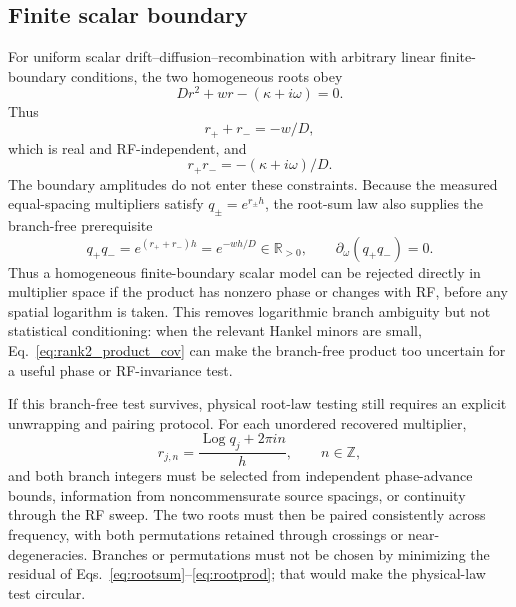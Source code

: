 \documentclass[11pt]{article}
\begin{document}
\subsection{Finite scalar boundary}

For uniform scalar drift--diffusion--recombination with arbitrary linear finite-boundary conditions, the two homogeneous roots obey
\begin{equation}
D r^2+w r-(\kappa+i\omega)=0.
\end{equation}
Thus
\begin{equation}
\boxed{r_++r_-=-w/D,}
\label{eq:rootsum}
\end{equation}
which is real and RF-independent, and
\begin{equation}
\boxed{r_+r_-=-(\kappa+i\omega)/D.}
\label{eq:rootprod}
\end{equation}
The boundary amplitudes do not enter these constraints. Because the measured equal-spacing multipliers satisfy $q_\pm=e^{r_\pm h}$, the root-sum law also supplies the branch-free prerequisite
\begin{equation}
\boxed{q_+q_-=e^{(r_++r_-)h}=e^{-wh/D}\in\mathbb{R}_{>0},\qquad \partial_\omega(q_+q_-)=0.}
\label{eq:multiplier_product_boundary}
\end{equation}
Thus a homogeneous finite-boundary scalar model can be rejected directly in multiplier space if the product has nonzero phase or changes with RF, before any spatial logarithm is taken. This removes logarithmic branch ambiguity but not statistical conditioning: when the relevant Hankel minors are small, Eq.~\eqref{eq:rank2_product_cov} can make the branch-free product too uncertain for a useful phase or RF-invariance test.

If this branch-free test survives, physical root-law testing still requires an explicit unwrapping and pairing protocol. For each unordered recovered multiplier,
\begin{equation}
r_{j,n}=\frac{\operatorname{Log}q_j+2\pi i n}{h},\qquad n\in\mathbb Z,
\end{equation}
and both branch integers must be selected from independent phase-advance bounds, information from noncommensurate source spacings, or continuity through the RF sweep. The two roots must then be paired consistently across frequency, with both permutations retained through crossings or near-degeneracies. Branches or permutations must not be chosen by minimizing the residual of Eqs.~\eqref{eq:rootsum}--\eqref{eq:rootprod}; that would make the physical-law test circular.
\end{document}
